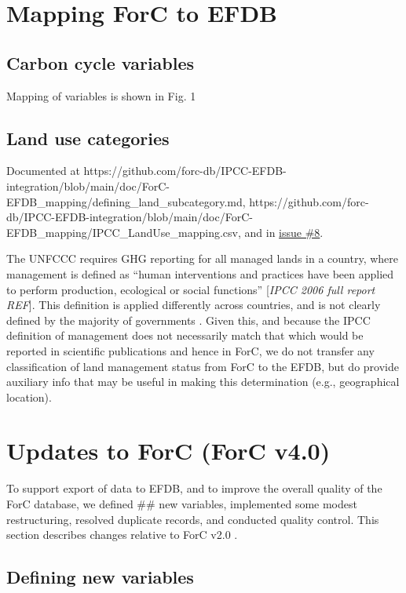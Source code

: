 \documentclass[, manuscript]{copernicus}
\begin{document}
\section{Mapping ForC to EFDB}

\subsection{Carbon cycle variables}

Mapping of variables is shown in Fig. 1

\subsection{Land use categories}

Documented at
https://github.com/forc-db/IPCC-EFDB-integration/blob/main/doc/ForC-EFDB\_mapping/defining\_land\_subcategory.md,
https://github.com/forc-db/IPCC-EFDB-integration/blob/main/doc/ForC-EFDB\_mapping/IPCC\_LandUse\_mapping.csv,
and in
\href{https://github.com/forc-db/IPCC_database_integration/issues/8}{issue
\#8}.

The UNFCCC requires GHG reporting for all managed lands in a country,
where management is defined as ``human interventions and practices have
been applied to perform production, ecological or social functions''
{[}\emph{IPCC 2006 full report REF}{]}. This definition is applied
differently across countries, and is not clearly defined by the majority
of governments \citep{ogle_delineating_2018}. Given this, and because
the IPCC definition of management does not necessarily match that which
would be reported in scientific publications and hence in ForC, we do
not transfer any classification of land management status from ForC to
the EFDB, but do provide auxiliary info that may be useful in making
this determination (e.g., geographical location).

\section{Updates to ForC (ForC v4.0)}

To support export of data to EFDB, and to improve the overall quality of
the ForC database, we defined \#\# new variables, implemented some
modest restructuring, resolved duplicate records, and conducted quality
control. This section describes changes relative to ForC v2.0
\citep{anderson-teixeira_forc_2018}.

\subsection{Defining new variables}
\end{document}
